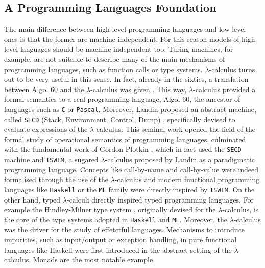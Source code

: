 \subsection{A Programming Languages Foundation}
The main difference between high level programming languages and low level ones is that the former are machine independent. For this reason models of high level languages should be machine-independent too. Turing machines, for example, are not suitable to describe many of the main mechanisms of programming languages, such as function calls or type systems. $\lambda$-calculus turns out to be very useful in this sense. In fact, already in the sixties, a translation between Algol 60 and the $\lambda$-calculus was given \cite{landin_correspondence_1965-1, landin_correspondence_1965}. This way, $\lambda$-calculus provided a formal semantics to a real programming language, Algol 60, the ancestor of languages such as \texttt{C} or \texttt{Pascal}. Moreover, Landin proposed an abstract machine, called \texttt{SECD} (Stack, Environment, Control, Dump) \cite{landin_mechanical_1964}, specifically devised to evaluate expressions of the $\lambda$-calculus. This seminal work opened the field of the formal study of operational semantics of programming languages, culminated with the fundamental work of Gordon Plotkin \cite{plotkin_call-by-name_1975}, which in fact used the \texttt{SECD} machine and \texttt{ISWIM}, a sugared $\lambda$-calculus proposed by Landin \cite{landin_next_1966} as a paradigmatic programming language. Concepts like call-by-name and call-by-value were indeed formalised through the use of the $\lambda$-calculus and modern functional programming languages like \texttt{Haskell} or the \texttt{ML} family were directly inspired by \texttt{ISWIM}. On the other hand, typed $\lambda$-calculi directly inspired typed programming languages. For example the Hindley-Milner type system \cite{hindley_principal_1969,milner_theory_1978}, originally devised for the $\lambda$-calculus, is the core of the type systems adopted in \texttt{Haskell} and \texttt{ML}. Moreover, the $\lambda$-calculus was the driver for the study of effetctful languages. Mechanisms to introduce impurities, such as input/output or exception handling, in pure functional languages like Haskell were first introduced in the abstract setting of the $\lambda$-calculus. Monads \cite{moggi_notions_1991} are the most notable example.

